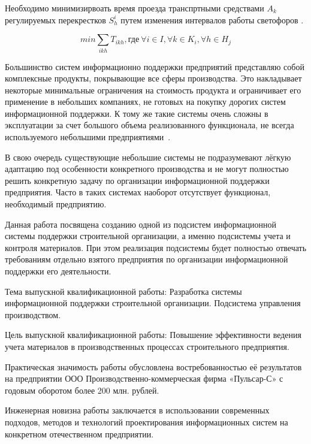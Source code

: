 \documentclass[a4paper,13pt]{article}
\begin{document}
Необходимо минимизирвоать время проезда транспртными средствами \begin{math}A_k\end{math} регулируемых перекрестков \begin{math}S^i_{h}\end{math} путем изменения интервалов работы светофоров .

\begin{equation}\label{eq:crosstime}
min \sum_{ikh} T_{ikh}, \text{где}\ \forall i \in I, \forall k \in K_i, \forall h \in H_j
\end{equation}

Большинство систем информационно поддержки предприятий представляю собой комплексные продукты, покрывающие все сферы производства. Это накладывает некоторые минимальные ограничения на стоимость продукта и ограничивает его применение в небольших компаниях, не готовых на покупку дорогих систем информационной поддержки. К тому же такие системы очень сложны в эксплуатации за счет большого объема реализованного функционала, не всегда используемого небольшими предприятиями~\cite{pb}.

В свою очередь существующие небольшие системы не подразумевают лёгкую адаптацию под особенности конкретного производства и не могут полностью решить конкретную задачу по организации информационной поддержки предприятия. Часто в таких системах наоборот  отсутствует функционал, необходимый предприятию.

Данная работа посвящена созданию одной из подсистем информационной системы поддержки строительной организации, а именно подсистемы учета и контроля материалов. При этом реализация подсистемы будет полностью отвечать требованиям отдельно взятого предприятия по организации информационной поддержки его деятельности.

Тема выпускной квалификационной работы:  Разработка системы информационной поддержки строительной организации. Подсистема управления производством.

Цель выпускной квалификационной работы: Повышение эффективности ведения учета материалов в производственных процессах строительного предприятия. 

Практическая значимость работы обусловлена востребованностью её результатов на предприятии ООО Производственно-коммерческая фирма «Пульсар-С» с годовым оборотом более 200 млн. рублей.

Инженерная новизна работы заключается в использовании современных подходов, методов и технологий проектирования информационных систем на конкретном отечественном предприятии.
\end{document}
